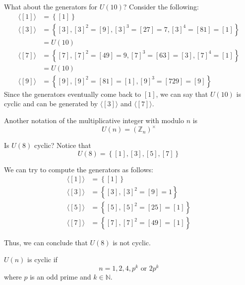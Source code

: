 \begin{nexample}
    What about the generators for \(U(10)\)? Consider the following:
    \[
    \begin{aligned}
        \langle [1] \rangle &= \left\{[1]\right\} \\
        \langle [3] \rangle &= \left\{[3], [3]^2 = [9], [3]^3 = [27] = 7, [3]^4 = [81] = [1]\right\} \\
                            &= U(10) \\
        \langle [7] \rangle &= \left\{[7], [7]^2 = [49] = 9, [7]^3 = [63] = [3], [7]^4 = [1]\right\} \\
                            &= U(10) \\
        \langle [9] \rangle &= \left\{[9], [9]^2 = [81] = [1], [9]^3 = [729] = [9]\right\}
    \end{aligned}
    \]
    Since the generators eventually come back to \([1]\), we can say that \(U(10)\) is cyclic and can be generated by \(\langle [3] \rangle\) and \(\langle [7] \rangle\).
\end{nexample}

\begin{distraction}
    Another notation of the multiplicative integer with modulo \(n\) is
    \[
        U(n) = \left(\mathbb{Z}_n\right)^\times
    \]
\end{distraction}

\begin{nexample}
    Is \(U(8)\) cyclic? Notice that
    \[
        U(8) = \left\{[1], [3], [5], [7]\right\}
    \]

    We can try to compute the generators as follows:
    \[
    \begin{aligned}
        \langle [1] \rangle &= \left\{[1]\right\} \\
        \langle [3] \rangle &= \left\{[3], [3]^2 = [9] = 1\right\} \\
        \langle [5] \rangle &= \left\{[5], [5]^2 = [25] = [1]\right\} \\
        \langle [7] \rangle &= \left\{[7], [7]^2 = [49] = [1]\right\}
    \end{aligned}
    \]

    Thus, we can conclude that \(U(8)\) is not cyclic.
\end{nexample}

\begin{remark}
    \(U(n)\) is cyclic if
    \[
        n = 1, 2, 4, p^k \text{ or } 2p^k
    \]
    where \(p\) is an odd prime and \(k \in \mathbb{N}\).
\end{remark}

